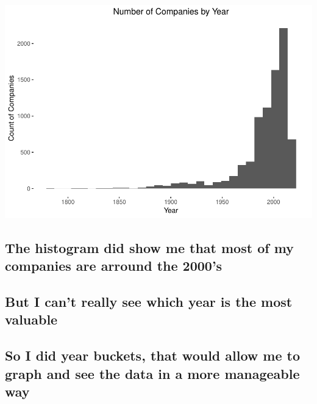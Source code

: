 \documentclass[]{article}
\begin{document}
\includegraphics{Main_files/figure-latex/unnamed-chunk-5-1.pdf}

\hypertarget{the-histogram-did-show-me-that-most-of-my-companies-are-arround-the-2000s}{%
\subsection{The histogram did show me that most of my companies are
arround the
2000's}\label{the-histogram-did-show-me-that-most-of-my-companies-are-arround-the-2000s}}

\hypertarget{but-i-cant-really-see-which-year-is-the-most-valuable}{%
\subsection{But I can't really see which year is the most
valuable}\label{but-i-cant-really-see-which-year-is-the-most-valuable}}

\hypertarget{so-i-did-year-buckets-that-would-allow-me-to-graph-and-see-the-data-in-a-more-manageable-way}{%
\subsection{So I did year buckets, that would allow me to graph and see
the data in a more manageable
way}\label{so-i-did-year-buckets-that-would-allow-me-to-graph-and-see-the-data-in-a-more-manageable-way}}
\end{document}
